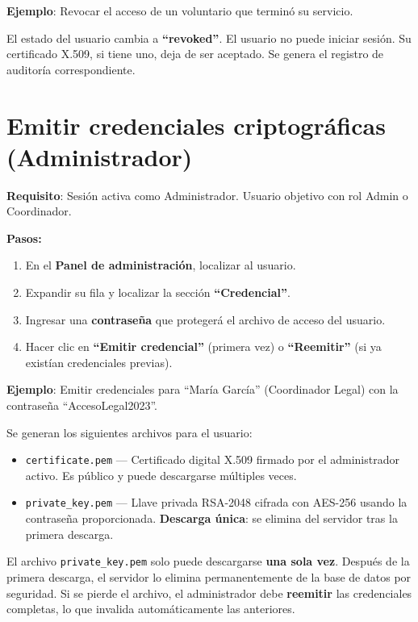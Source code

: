 \documentclass[10pt,letterpaper]{report}
\begin{document}
\textbf{Ejemplo}: Revocar el acceso de un voluntario que terminó su servicio.

\begin{successbox}
  El estado del usuario cambia a \textbf{``revoked''}. El usuario no puede iniciar sesión. Su certificado X.509, si tiene uno, deja de ser aceptado. Se genera el registro de auditoría correspondiente.
\end{successbox}

\section{Emitir credenciales criptográficas (Administrador)}

\textbf{Requisito}: Sesión activa como Administrador. Usuario objetivo con rol Admin o Coordinador.

\textbf{Pasos:}
\begin{enumerate}[leftmargin=2cm]
  \item En el \textbf{Panel de administración}, localizar al usuario.
  \item Expandir su fila y localizar la sección \textbf{``Credencial''}.
  \item Ingresar una \textbf{contraseña} que protegerá el archivo de acceso del usuario.
  \item Hacer clic en \textbf{``Emitir credencial''} (primera vez) o \textbf{``Reemitir''} (si ya existían credenciales previas).
\end{enumerate}

\textbf{Ejemplo}: Emitir credenciales para ``María García'' (Coordinador Legal) con la contraseña ``AccesoLegal2023''.

\begin{successbox}
  Se generan los siguientes archivos para el usuario:
  \begin{itemize}
    \item \texttt{certificate.pem} --- Certificado digital X.509 firmado por el administrador activo. Es público y puede descargarse múltiples veces.
    \item \texttt{private\_key.pem} --- Llave privada RSA-2048 cifrada con AES-256 usando la contraseña proporcionada. \textbf{Descarga única}: se elimina del servidor tras la primera descarga.
  \end{itemize}
\end{successbox}

\begin{warningbox}
  El archivo \texttt{private\_key.pem} solo puede descargarse \textbf{una sola vez}. Después de la primera descarga, el servidor lo elimina permanentemente de la base de datos por seguridad. Si se pierde el archivo, el administrador debe \textbf{reemitir} las credenciales completas, lo que invalida automáticamente las anteriores.
\end{warningbox}
\end{document}
